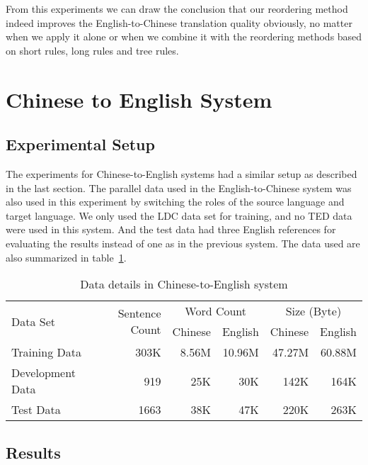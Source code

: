 %

From this experiments we can draw the conclusion that our reordering method indeed improves the English-to-Chinese translation quality obviously, no matter when we apply it alone or when we combine it with the reordering methods based on short rules, long rules and tree rules. %

\section{Chinese to English System}
\label{ch:Evaluation:sec:zhen2}


\subsection{Experimental Setup}

The experiments for Chinese-to-English systems had a similar setup as described in the last section. The parallel data used in the English-to-Chinese system was also used in this experiment by switching the roles of the source language and target language. We only used the LDC data set for training, and no TED data were used in this system. And the test data had three English references for evaluating the results instead of one as in the previous system. The data used are also summarized in table~\ref{dzhen2}.


\begin{table}[H]
\centering
\begin{tabular}{|l|r|r|r|r|r|}
\hline
\multirow{2}{*}{Data Set} & \multirow{2}{*}{Sentence Count} & \multicolumn{2}{c|}{Word Count} & \multicolumn{2}{c|}{Size (Byte)}\\ \cline{3-6}
& & Chinese & English & Chinese & English \\
\hline
Training Data & 303K & 8.56M & 10.96M & 47.27M & 60.88M\\ \hline
Development Data & 919 & 25K & 30K & 142K & 164K \\ \hline
Test Data & 1663 & 38K & 47K & 220K & 263K \\ \hline
\end{tabular}
\caption{Data details in Chinese-to-English system}
\label{dzhen2}
\end{table}

\subsection{Results}

